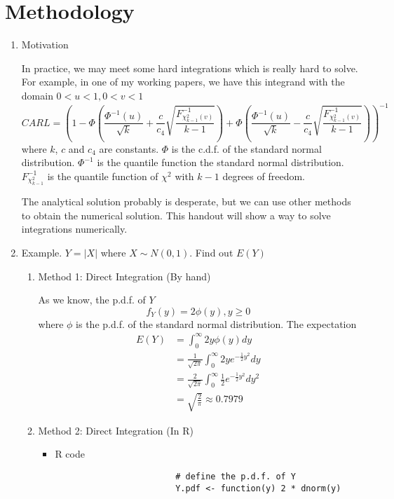 \section{Methodology}
\begin{enumerate}
	\item Motivation
	\par In practice, we may meet some hard integrations which is really hard to solve. For example, in one of my working papers, we have this integrand with the domain $0<u<1, 0<v<1$
		\begin{equation*}
			CARL = (1 - \Phi(\frac{\Phi^{-1}(u)}{\sqrt{k}} + \frac{c}{c_4}\sqrt{\frac{F^{-1}_{\chi^2_{k-1}(v)}}{k-1}}) + \Phi(\frac{\Phi^{-1}(u)}{\sqrt{k}} - \frac{c}{c_4}\sqrt{\frac{F^{-1}_{\chi^2_{k-1}(v)}}{k-1}}))^{-1}
		\end{equation*}
		where $k$, $c$ and $c_4$ are constants. $\Phi$ is the c.d.f. of the standard normal distribution. $\Phi^{-1}$ is the quantile function the standard normal distribution. $F^{-1}_{\chi^2_{k-1}}$ is the quantile function of $\chi^2$ with $k-1$ degrees of freedom. 
		\par The analytical solution probably is desperate, but we can use other methods to obtain the numerical solution. This handout will show a way to solve integrations numerically.
	
	\item Example. $Y = |X|$ where $X \sim N(0, 1)$. Find out $E(Y)$
		\begin{enumerate}
			\item Method 1: Direct Integration (By hand)
				\par As we know, the p.d.f. of $Y$
				\begin{equation*}
					f_Y(y) = 2\phi(y), y \ge 0
				\end{equation*}
				where $\phi$ is the p.d.f. of the standard normal distribution. The expectation
				\begin{equation*}
					\begin{split}
						E(Y) &= \int_{0}^{\infty} 2y\phi(y) dy \\
						& = \frac{1}{\sqrt{2\pi}}\int_{0}^{\infty} 2y e^{-\frac{1}{2}y^2}dy \\
						& = \frac{2}{\sqrt{2\pi}}\int_{0}^{\infty} \frac{1}{2} e^{-\frac{1}{2}y^2}dy^2 \\
						& = \sqrt{\frac{2}{\pi}} \approx 0.7979
					\end{split}
				\end{equation*}
			\item Method 2: Direct Integration (In R)
				\begin{itemize}
					\item R code
					\begin{verbatim}
						# define the p.d.f. of Y
						Y.pdf <- function(y) 2 * dnorm(y)
						

\end{verbatim}
\end{itemize}
\end{enumerate}
\end{enumerate}
